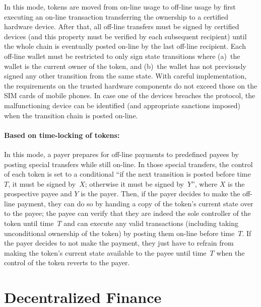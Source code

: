 \documentclass{article}
\begin{document}
In this mode, tokens are moved from on-line usage to off-line usage by first executing an on-line transaction transferring the ownership to a certified hardware device. After that, all off-line transfers must be signed by certified devices (and this property must be verified by each subsequent recipient) until the whole chain is eventually posted on-line by the last off-line recipient. Each off-line wallet must be restricted to only sign state transitions where (a)~the wallet is the current owner of the token, and (b)~the wallet has not previously signed any other transition from the same state. With careful implementation, the requirements on the trusted hardware components do not exceed those on the SIM cards of mobile phones. In case one of the devices breaches the protocol, the malfunctioning device can be identified (and appropriate sanctions imposed) when the transition chain is posted on-line.

\paragraph{Based on time-locking of tokens:}

In this mode, a payer prepares for off-line payments to predefined payees by posting special transfers while still on-line. In those special transfers, the control of each token is set to a conditional ``if the next transition is posted before time~$T$, it must be signed by~$X$; otherwise it must be signed by~$Y$'', where $X$ is the prospective payee and $Y$ is the payer. Then, if the payer decides to make the off-line payment, they can do so by handing a copy of the token's current state over to the payee; the payee can verify that they are indeed the sole controller of the token until time~$T$ and can execute any valid transactions (including taking unconditional ownership of the token) by posting them on-line before time~$T$. If the payer decides to not make the payment, they just have to refrain from making the token's current state available to the payee until time~$T$ when the control of the token reverts to the payer.

\section{Decentralized Finance}
\end{document}
